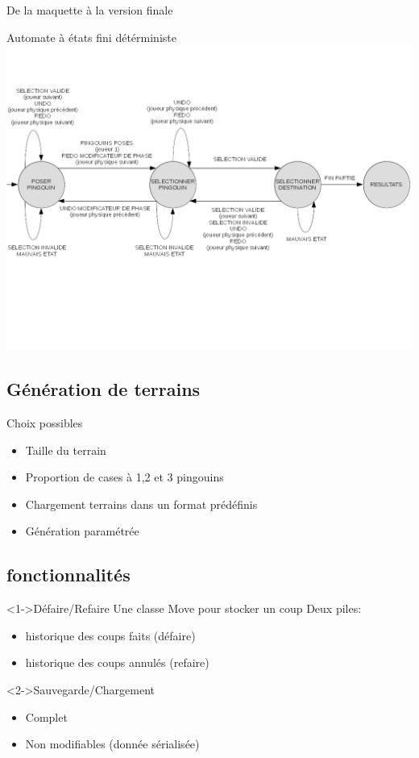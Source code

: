\documentclass{beamer}
\begin{document}
\begin{frame}{De la maquette à la version finale}
\begin{frame}{Automate à états fini détérministe}
\includegraphics[scale=0.4]{AFD}
\end{frame}

\subsection{Génération de terrains}

\begin{frame}{}
\begin{block}{Choix possibles}
\begin{itemize}
\item<1-> Taille du terrain
\item<2-> Proportion de cases à 1,2 et 3 pingouins
\item<3-> Chargement terrains dans un format prédéfinis
\item<4-> Génération paramétrée
\end{itemize}
\end{block}
\end{frame}

\subsection{fonctionnalités}
\begin{frame}{}
\begin{block}<1->{Défaire/Refaire} %
Une classe Move pour stocker un coup \newline
Deux piles: 
\begin{itemize}
 \item historique des coups faits (défaire)
 \item historique des coups annulés (refaire)
\end{itemize}
\end{block}
\begin{block}<2->{Sauvegarde/Chargement}
\begin{itemize}
\item Complet
\item Non modifiables (donnée sérialisée)
\end{itemize}
\end{block}
\end{frame}


\end{frame}
\end{document}
